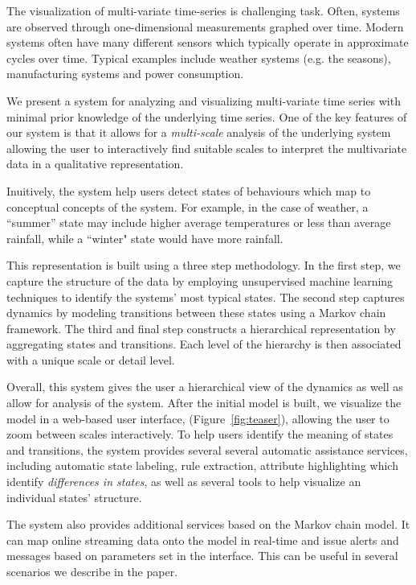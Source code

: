 The visualization of multi-variate time-series is challenging task. Often, systems are observed through one-dimensional measurements graphed over time. Modern systems often have many different sensors which 
typically operate in approximate cycles over time. Typical examples include weather systems (e.g. the seasons), manufacturing systems and power consumption. 

We present a system for analyzing and visualizing multi-variate time series with minimal prior knowledge of the underlying time series. One of the key features of our system is that it allows for a \emph{multi-scale} analysis of the underlying system allowing the user to interactively find suitable scales to interpret the multivariate data in a qualitative representation.  

Inuitively, the system help users detect states of behaviours which map to conceptual concepts of the system. For example, in the case of weather, a ``summer'' state may include higher average temperatures or less than average rainfall, while a ``winter" state would have more rainfall. 

This representation is built using a three step methodology. In the first
step, we capture the structure of the data by employing unsupervised machine learning
techniques to identify the systems' most typical states. The second step captures
dynamics by modeling transitions between these states using a Markov chain framework.
The third and final step constructs a hierarchical representation by aggregating
states and transitions. Each level of the hierarchy is then associated with a unique
scale or detail level.

Overall, this system gives the user a hierarchical view of the dynamics as well as 
allow for analysis of the system. After the initial model is built, we visualize the model
in a web-based user interface, (Figure~\ref{fig:teaser}), allowing the 
user to zoom between scales interactively. To help users identify the
meaning of states and transitions, the system provides several several automatic assistance services,
including automatic state labeling, rule extraction, attribute highlighting which
identify \emph{differences in states}, as well as several tools to help visualize an individual states'
structure. 

The system also provides additional services based on the Markov chain model. It can map online streaming data onto 
the model in real-time and issue alerts and messages based on parameters set in the interface. This can be useful in several scenarios we describe in the paper.

